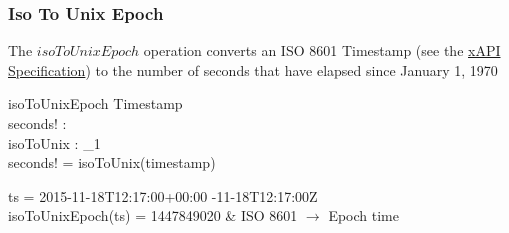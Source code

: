 \documentclass[../../main.tex]{subfiles}
\begin{document}
\subsubsection{Iso To Unix Epoch}
The $isoToUnixEpoch$ operation converts an ISO 8601 Timestamp (see the \href{https://github.com/adlnet/xAPI-Spec/blob/master/xAPI-Data.md#timestamps}{xAPI Specification})
to the number of seconds that have elapsed since January 1, 1970
\begin{schema}{isoToUnixEpoch}
  Timestamp \\
  seconds! : \nat \\
  isoToUnix : \finset_1 \fun \nat \\
  \where
  seconds! = isoToUnix(timestamp)
\end{schema}
\begin{argue}
  ts = 2015-11-18T12:17:00+00:00 -11-18T12:17:00Z \\
  isoToUnixEpoch(ts) =  1447849020 & ISO 8601 $\to$ Epoch time
\end{argue}
\end{document}
